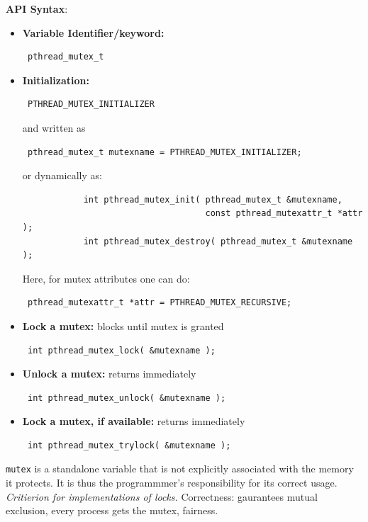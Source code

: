 \documentclass[12pt, a4paper]{report}
\begin{document}
{\bfseries{API Syntax}}:
\begin{itemize}
    \item {\bfseries{Variable Identifier/keyword:}} \begin{verbatim} pthread_mutex_t \end{verbatim} 
    \item {\bfseries{Initialization:}}  \begin{verbatim} PTHREAD_MUTEX_INITIALIZER \end{verbatim}
          and written as \begin{verbatim} pthread_mutex_t mutexname = PTHREAD_MUTEX_INITIALIZER; \end{verbatim}
          or dynamically as: 
        \begin{verbatim} 
            int pthread_mutex_init( pthread_mutex_t &mutexname,
                                    const pthread_mutexattr_t *attr ); 
            int pthread_mutex_destroy( pthread_mutex_t &mutexname ); 
        \end{verbatim}
        Here, for mutex attributes one can do: \begin{verbatim} pthread_mutexattr_t *attr = PTHREAD_MUTEX_RECURSIVE; \end{verbatim}
    \item {\bfseries{Lock a mutex:}} blocks until mutex is granted
          \begin{verbatim} int pthread_mutex_lock( &mutexname ); \end{verbatim}
    \item {\bfseries{Unlock a mutex:}} returns immediately
          \begin{verbatim} int pthread_mutex_unlock( &mutexname ); \end{verbatim}
    \item {\bfseries{Lock a mutex, if available:}} returns immediately
          \begin{verbatim} int pthread_mutex_trylock( &mutexname ); \end{verbatim}
\end{itemize}

{\texttt {mutex}} is a standalone variable that is not explicitly associated with the memory it protects. It is thus the programmmer's
responsibility for its correct usage.\\
{\textit{Critierion for implementations of locks.}} Correctness: gaurantees mutual exclusion, every process gets the mutex, fairness.
\end{document}
